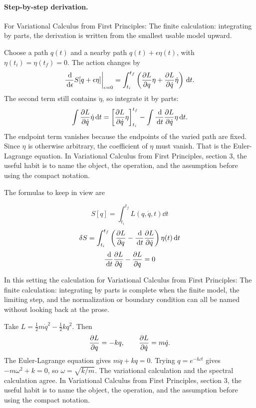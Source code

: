 \paragraph{Step-by-step derivation.}

For Variational Calculus from First Principles: The finite calculation: integrating by parts, the derivation is written from the smallest usable model upward.

Choose a path \(q(t)\) and a nearby path \(q(t)+\epsilon\eta(t)\), with \(\eta(t_i)=\eta(t_f)=0\).  The action changes by
\[
  \frac{\,\mathrm d}{\,\mathrm d\epsilon}S[q+\epsilon\eta]\bigg|_{\epsilon=0}
  =
  \int_{t_i}^{t_f}
  \left(
  \frac{\partial L}{\partial q}\eta+\frac{\partial L}{\partial\dot q}\dot\eta
  \right)\,\mathrm d t.
\]
The second term still contains \(\dot\eta\), so integrate it by parts:
\[
  \int \frac{\partial L}{\partial\dot q}\dot\eta\,\mathrm d t
  =
  \left[\frac{\partial L}{\partial\dot q}\eta\right]_{t_i}^{t_f}
  -
  \int \frac{\,\mathrm d}{\,\mathrm d t}\frac{\partial L}{\partial\dot q}\eta\,\mathrm d t.
\]
The endpoint term vanishes because the endpoints of the varied path are fixed.  Since \(\eta\) is otherwise arbitrary, the coefficient of \(\eta\) must vanish.  That is the Euler-Lagrange equation.  In Variational Calculus from First Principles, section 3, the useful habit is to name the object, the operation, and the assumption before using the compact notation.

The formulas to keep in view are

\[
  S[q]=\int_{t_i}^{t_f}L(q,\dot q,t)\dd t
\]
\[
  \delta S=\int_{t_i}^{t_f}\left(\frac{\partial L}{\partial q}-\frac{\,\mathrm d}{\,\mathrm d t}\frac{\partial L}{\partial\dot q}\right)\eta(t)\,\mathrm d t
\]
\[
  \frac{\,\mathrm d}{\,\mathrm d t}\frac{\partial L}{\partial\dot q}-\frac{\partial L}{\partial q}=0
\]

In this setting the calculation for Variational Calculus from First Principles: The finite calculation: integrating by parts is complete when the finite model, the limiting step, and the normalization or boundary condition can all be named without looking back at the prose.




\begin{example}
Take \(L=\frac12m\dot q^2-\frac12kq^2\).  Then
\[
  \frac{\partial L}{\partial q}=-kq,\qquad \frac{\partial L}{\partial\dot q}=m\dot q.
\]
The Euler-Lagrange equation gives \(m\ddot q+kq=0\).  Trying \(q=e^{-\ii\omega t}\) gives \(-m\omega^2+k=0\), so \(\omega=\sqrt{k/m}\).  The variational calculation and the spectral calculation agree.  In Variational Calculus from First Principles, section 3, the useful habit is to name the object, the operation, and the assumption before using the compact notation.
\end{example}



